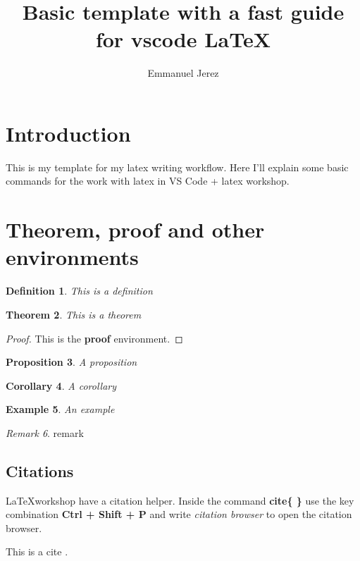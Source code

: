 \documentclass[12pt,final]{article}
\title{Basic template with a fast guide for vscode \LaTeX}
\author{Emmanuel Jerez}
\numberwithin{equation}{section}
\newtheorem{theorem}{Theorem}
\newtheorem{definition}[theorem]{Definition}
\newtheorem{example}[theorem]{Example}
\newtheorem{corollary}[theorem]{Corollary}
\newtheorem{proposition}[theorem]{Proposition}
\theoremstyle{remark}
\newtheorem{remark}[theorem]{Remark}
\begin{document}
 \maketitle

 \section{Introduction}

This is my template for my latex writing workflow. Here I'll explain some basic commands for the work with latex in VS Code + latex workshop.

 \section{Theorem, proof and other environments}

 \begin{definition}
  This is a definition
 \end{definition}

 \begin{theorem}
   This is a theorem
 \end{theorem}

 \begin{proof}
  This is the \textbf{proof} environment.
 \end{proof}

 \begin{proposition}
  A proposition
 \end{proposition}

 \begin{corollary}
  A corollary
 \end{corollary}

 \begin{example}
  An example
 \end{example}
 
\begin{remark}
  remark
\end{remark}

\subsection*{Citations}

\LaTeX workshop have a citation helper. Inside the command \textbf{cite\{ \}} use the key combination \textbf{Ctrl + Shift + P} and write \textit{citation browser} to open the citation browser. 

This is a cite \cite[Theorem 1]{SOLOMON1967603}.
\end{document}
